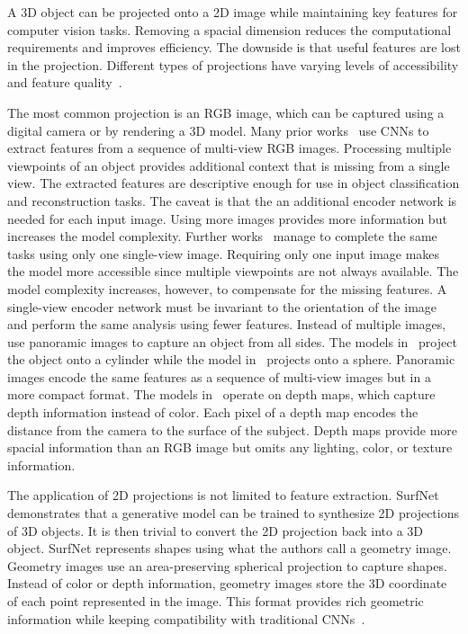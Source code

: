 A 3D object can be projected onto a 2D image while maintaining key features for computer vision tasks. Removing a spacial dimension reduces the computational requirements and improves efficiency. The downside is that useful features are lost in the projection. Different types of projections have varying levels of accessibility and feature quality~\cite{Ahmed2018}.

The most common projection is an RGB image, which can be captured using a digital camera or by rendering a 3D model. Many prior works~\cite{Zhu2014, Su2015, Choy2016, Smith2018} use CNNs to extract features from a sequence of multi-view RGB images. Processing multiple viewpoints of an object provides additional context that is missing from a single view. The extracted features are descriptive enough for use in object classification and reconstruction tasks. The caveat is that the an additional encoder network is needed for each input image. Using more images provides more information but increases the model complexity. Further works~\cite{Fan2017, Wang2018, Niu2018, Genova2020, Pan2019} manage to complete the same tasks using only one single-view image. Requiring only one input image makes the model more accessible since multiple viewpoints are not always available. The model complexity increases, however, to compensate for the missing features. A single-view encoder network must be invariant to the orientation of the image and perform the same analysis using fewer features. Instead of multiple images, \cite{Shi2015, Sfikas2017, Cao2017} use panoramic images to capture an object from all sides. The models in~\cite{Shi2015, Sfikas2017} project the object onto a cylinder while the model in~\cite{Cao2017} projects onto a sphere. Panoramic images encode the same features as a sequence of multi-view images but in a more compact format. The models in~\cite{Zhu2014, Genova2020, Shi2015, Sfikas2017, Cao2017} operate on depth maps, which capture depth information instead of color. Each pixel of a depth map encodes the distance from the camera to the surface of the subject. Depth maps provide more spacial information than an RGB image but omits any lighting, color, or texture information.

The application of 2D projections is not limited to feature extraction. SurfNet~\cite{Sinha2017} demonstrates that a generative model can be trained to synthesize 2D projections of 3D objects. It is then trivial to convert the 2D projection back into a 3D object. SurfNet represents shapes using what the authors call a geometry image. Geometry images use an area-preserving spherical projection to capture shapes. Instead of color or depth information, geometry images store the 3D coordinate of each point represented in the image. This format provides rich geometric information while keeping compatibility with traditional CNNs~\cite{Sinha2017}.

